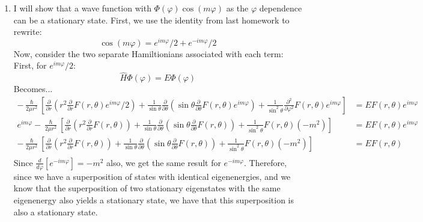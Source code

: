 \documentclass[10pt]{article}
\begin{document}
\begin{enumerate}
\begin{enumerate}
    \item I will show that a wave function with $ \Phi \left( \varphi \right) \cos \left(  m \varphi \right)$ as the $  \varphi $ dependence can be a stationary state.
      First, we use the identity from last homework to rewrite:
      \begin{equation*}
        \cos \left( m \varphi \right) = e ^ {im\varphi}/2 + e ^ {-im\varphi}/2
      \end{equation*}
      Now, consider the two separate Hamiltionians associated with each term: \\
      First, for $ e ^ {im\varphi}/2 $:
      \begin{equation*}
        \hat{H} \Phi \left( \varphi \right) = E \Phi \left( \varphi \right)
      \end{equation*}
      Becomes...
      \begin{align*}
        - \frac{\hslash}{2\mu r^2} \left[ \frac{\partial }{\partial r} \left( r^2 \frac{\partial }{\partial r} F \left( r, \theta \right) e ^ {im \varphi} /2\right) + \frac{1}{\sin\theta} \frac{\partial }{\partial \theta} \left( \sin\theta \frac{\partial }{\partial \theta} F \left( r, \theta \right) e ^ {im \varphi} \right) + \frac{1}{\sin ^2 \theta} \frac{\partial^2 }{\partial \varphi^2} F \left( r, \theta \right) e ^ {im \varphi} \right] &= E F \left( r, \theta \right) e ^ {im \varphi} \\
        e ^ {im \varphi}- \frac{\hslash}{2\mu r^2} \left[ \frac{\partial }{\partial r} \left( r^2 \frac{\partial }{\partial r} F \left( r, \theta \right) \right) + \frac{1}{\sin\theta} \frac{\partial }{\partial \theta} \left( \sin\theta \frac{\partial }{\partial \theta} F \left( r, \theta \right) \right) + \frac{1}{\sin ^2 \theta} F \left( r, \theta \right) \left( -m^2 \right) \right] &= E F \left( r, \theta \right) e ^ {im \varphi} \\
        - \frac{\hslash}{2\mu r^2} \left[ \frac{\partial }{\partial r} \left( r^2 \frac{\partial }{\partial r} F \left( r, \theta \right) \right) + \frac{1}{\sin\theta} \frac{\partial }{\partial \theta} \left( \sin\theta \frac{\partial }{\partial \theta} F \left( r, \theta \right) \right) + \frac{1}{\sin ^2 \theta} F \left( r, \theta \right) \left( -m^2 \right) \right] &= E F \left( r, \theta \right) \\
      \end{align*}
      Since $ \frac{d}{d \varphi} \left[ e ^ {-im\varphi} \right] = -m^2 $ also, we get the same result for $ e ^ {-im\varphi} $.
      Therefore, since we have a superposition of states with identical eigenenergies, and we know that the superposition of two stationary eigenstates with the same eigenenergy also yields a stationary state, we have that this superposition is also a stationary state.

\end{enumerate}
\end{enumerate}
\end{document}
